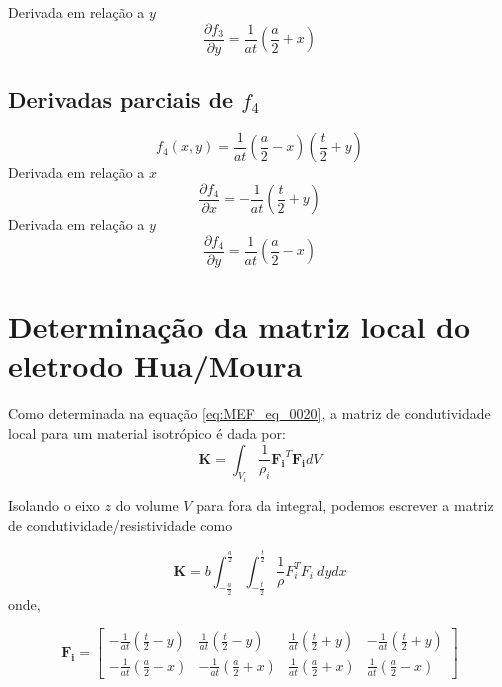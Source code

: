 \documentclass[
12pt,
a4paper,
oneside,
chapter=TITLE,
sumario=tradicional
]{abntex2}
\begin{document}
 Derivada em relação a $y$
 \begin{equation}
 	\frac{\partial f_3}{\partial y} = \frac{1}{at}\left(\frac{a}{2} + x\right)
 	\label{eq:MEF_eq_0033}
 \end{equation}
 
 \subsection*{Derivadas parciais de $f_4$}
 $$
 f_4(x,y)=\frac{1}{at}\left(\frac{a}{2}-x\right)\left(\frac{t}{2} + y\right)
 $$
 Derivada em relação a $x$
 \begin{equation}
 	 \frac{\partial f_4}{\partial x} = -\frac{1}{at}\left(\frac{t}{2} + y\right)
 	 \label{eq:MEF_eq_0034} 
 \end{equation}
 Derivada em relação a $y$
 \begin{equation}
 	\frac{\partial f_4}{\partial y} = \frac{1}{at}\left(\frac{a}{2} - x\right) 
 	\label{eq:MEF_eq_0035}
 \end{equation}
 
 \begin{center}
 \end{center}
 
 \section{Determinação da matriz local do eletrodo Hua/Moura}
 
 Como determinada na equação \ref{eq:MEF_eq_0020}, a matriz de condutividade local para um material isotrópico é dada por: 
 $$ \mathbf{K} = \int_{V_i}\frac{1}{\rho_i}\mathbf{F_i}^{T}\mathbf{F_i} dV $$
 
 Isolando o eixo $z$ do volume $V$ para fora da integral, podemos escrever a matriz de condutividade/resistividade como 
 
 \begin{equation}
 	\mathbf{K} =
 	 b
 	\int_{-\frac{a}{2}}^{\frac{a}{2}}
 	\int_{-\frac{t}{2}}^{\frac{t}{2}}
 	\frac{1}{\rho} F_i^{T}F_i\ dy dx
 	\label{eq:MEF_eq_0036}
 \end{equation}
 onde,
 
 $$
  \mathbf{F_i} = 
 \begin{bmatrix}
 	-\frac{1}{at}\left(\frac{t}{2} - y\right) & \frac{1}{at}\left(\frac{t}{2} - y\right) & \frac{1}{at}\left(\frac{t}{2} + y\right) & -\frac{1}{at}\left(\frac{t}{2} + y\right) \\
 	-\frac{1}{at}\left(\frac{a}{2} - x\right) & -\frac{1}{at}\left(\frac{a}{2} + x\right) & \frac{1}{at}\left(\frac{a}{2} + x\right) & \frac{1}{at}\left(\frac{a}{2} - x\right)
 \end{bmatrix}
 $$
 
\end{document}
